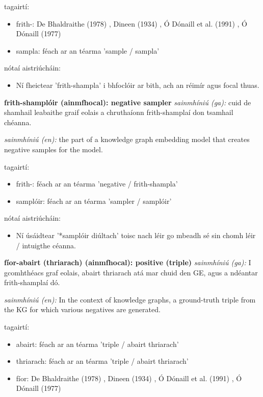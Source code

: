 \documentclass{article}
\begin{document}
tagairtí:
\begin{itemize}
	\item frith-: De Bhaldraithe (1978) \cite{de-bhaldraithe}, Dineen (1934) \cite{dineen}, Ó Dónaill et al. (1991) \cite{focloir-beag}, Ó Dónaill (1977) \cite{odonaill}
	\item sampla: féach ar an téarma 'sample / sampla'
\end{itemize}

nótaí aistriúcháin:
\begin{itemize}
	\item Ní fheictear 'frith-shampla' i bhfoclóir ar bith, ach an réimír agus focal thuas.
\end{itemize}


\textbf{frith-shamplóir (ainmfhocal): negative sampler}
\textit{sainmhíniú (ga):} cuid de shamhail leabaithe graif eolais a chruthaíonn frith-shamplaí don tsamhail chéanna.

\textit{sainmhíniú (en):} the part of a knowledge graph embedding model that creates negative samples for the model.

tagairtí:
\begin{itemize}
	\item frith-: féach ar an téarma 'negative / frith-shampla'
	\item samplóir: féach ar an téarma 'sampler / samplóir'
\end{itemize}

nótaí aistriúcháin:
\begin{itemize}
	\item Ní úsáidtear '*samplóir diúltach' toisc nach léir go mbeadh sé sin chomh léir / intuigthe céanna.
\end{itemize}


\textbf{fíor-abairt (thriarach) (ainmfhocal): positive (triple)}
\textit{sainmhíniú (ga):} I gcomhthéacs graf eolais, abairt thriarach atá mar chuid den GE, agus a ndéantar frith-shamplaí dó.

\textit{sainmhíniú (en):} In the context of knowledge graphs, a ground-truth triple from the KG for which various negatives are generated.

tagairtí:
\begin{itemize}
	\item abairt: féach ar an téarma 'triple / abairt thriarach'
	\item thriarach: féach ar an téarma 'triple / abairt thriarach'
	\item fíor: De Bhaldraithe (1978) \cite{de-bhaldraithe}, Dineen (1934) \cite{dineen}, Ó Dónaill et al. (1991) \cite{focloir-beag}, Ó Dónaill (1977) \cite{odonaill}
\end{itemize}
\end{document}
